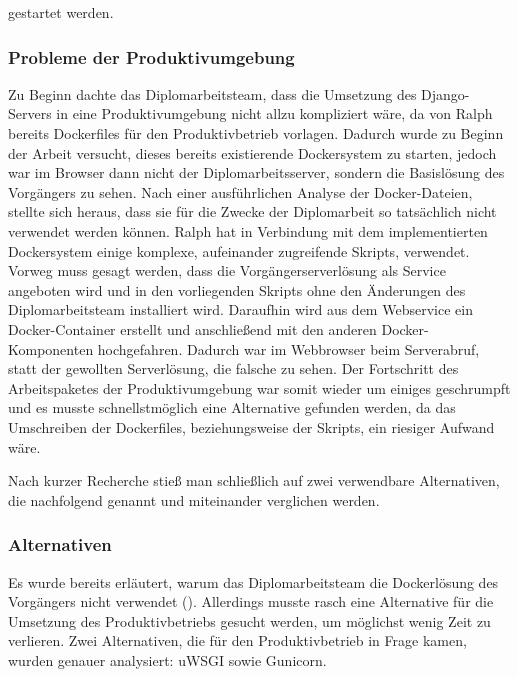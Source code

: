 \documentclass[
]{article}
\begin{document}
gestartet werden.

\hypertarget{probleme-der-produktivumgebung}{%
\subsubsection{Probleme der
Produktivumgebung}\label{probleme-der-produktivumgebung}}

Zu Beginn dachte das Diplomarbeitsteam, dass die Umsetzung des
Django-Servers in eine Produktivumgebung nicht allzu kompliziert wäre,
da von Ralph bereits Dockerfiles für den Produktivbetrieb vorlagen.
Dadurch wurde zu Beginn der Arbeit versucht, dieses bereits existierende
Dockersystem zu starten, jedoch war im Browser dann nicht der
Diplomarbeitsserver, sondern die Basislösung des Vorgängers zu sehen.
Nach einer ausführlichen Analyse der Docker-Dateien, stellte sich
heraus, dass sie für die Zwecke der Diplomarbeit so tatsächlich nicht
verwendet werden können. Ralph hat in Verbindung mit dem implementierten
Dockersystem einige komplexe, aufeinander zugreifende Skripts,
verwendet. Vorweg muss gesagt werden, dass die Vorgängerserverlösung als
Service angeboten wird und in den vorliegenden Skripts ohne den
Änderungen des Diplomarbeitsteam installiert wird. Daraufhin wird aus
dem Webservice ein Docker-Container erstellt und anschließend mit den
anderen Docker-Komponenten hochgefahren. Dadurch war im Webbrowser beim
Serverabruf, statt der gewollten Serverlösung, die falsche zu sehen. Der
Fortschritt des Arbeitspaketes der Produktivumgebung war somit wieder um
einiges geschrumpft und es musste schnellstmöglich eine Alternative
gefunden werden, da das Umschreiben der Dockerfiles, beziehungsweise der
Skripts, ein riesiger Aufwand wäre.

Nach kurzer Recherche stieß man schließlich auf zwei verwendbare
Alternativen, die nachfolgend genannt und miteinander verglichen werden.

\hypertarget{alternativen}{%
\subsubsection{Alternativen}\label{alternativen}}

Es wurde bereits erläutert, warum das Diplomarbeitsteam die Dockerlösung
des Vorgängers nicht verwendet ().
Allerdings musste rasch eine Alternative für die Umsetzung des
Produktivbetriebs gesucht werden, um möglichst wenig Zeit zu verlieren.
Zwei Alternativen, die für den Produktivbetrieb in Frage kamen, wurden
genauer analysiert: uWSGI sowie Gunicorn.
\end{document}
